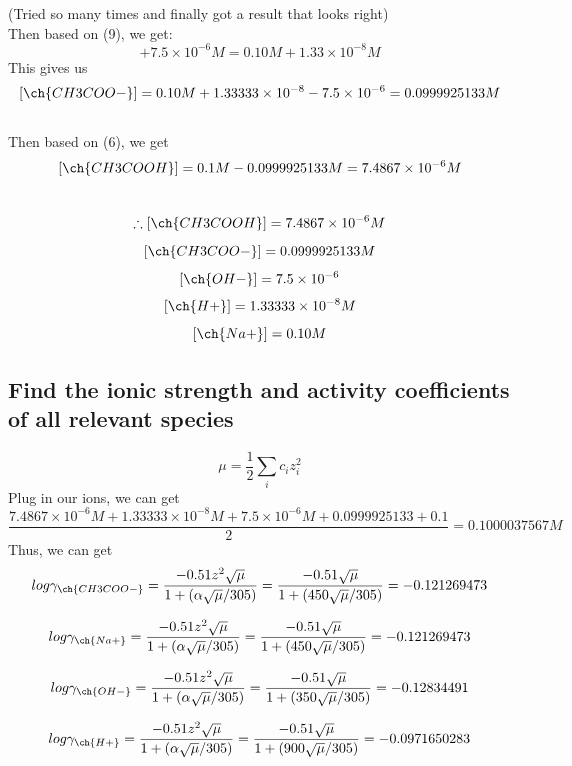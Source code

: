 \documentclass{article}
\begin{document}
\begin{large}
(Tried so many times and finally got a result that looks right)\\
Then based on (9), we get:
\begin{equation}
[\ch{CH3COO-}] + 7.5 \times 10^{-6}M = 0.10 M + 1.33 \times 10^{-8}M
\end{equation}
This gives us $$[\ch{CH3COO-}] = 0.10 M + 1.33333 \times 10^{-8} - 7.5 \times 10^{-6} = 0.0999925133M$$\\
Then based on (6), we get $$[\ch{CH3COOH}] = 0.1M - 0.0999925133M = 7.4867\times 10^{-6}M$$\\
$$\therefore [\ch{CH3COOH}]=7.4867\times 10^{-6}M$$
$$ [\ch{CH3COO-}]=0.0999925133M$$ $$[\ch{OH-}] = 7.5\times 10^{-6}$$
$$[\ch{H+}] = 1.33333 \times 10^{-8}M$$
$$[\ch{Na+}] = 0.10M$$

\subsection{Find the ionic strength and activity coefficients of all relevant species}
\begin{equation}
\mu = \frac{1}{2}\sum_i c_i z_i^2
\end{equation}
Plug in our ions, we can get
\begin{equation}
\frac{    7.4867\times 10^{-6}M + 1.33333 \times 10^{-8}M + 7.5\times 10^{-6}M + 0.0999925133 + 0.1}{2}  = 0.1000037567M
\end{equation}
Thus, we can get 
\begin{equation}
log \gamma_{\ch{CH3COO-}} = \frac{-0.51z^2\sqrt{\mu}}{1+(\alpha \sqrt{\mu}/305)} = 
\frac{-0.51\sqrt{\mu}}{1+(450\sqrt{\mu}/305)} = -0.121269473
\end{equation}

\begin{equation}
log \gamma_{\ch{Na+}} = \frac{-0.51z^2\sqrt{\mu}}{1+(\alpha \sqrt{\mu}/305)} = 
\frac{-0.51\sqrt{\mu}}{1+(450\sqrt{\mu}/305)} = -0.121269473
\end{equation}

\begin{equation}
log \gamma_{\ch{OH-}} = \frac{-0.51z^2\sqrt{\mu}}{1+(\alpha \sqrt{\mu}/305)} = 
\frac{-0.51\sqrt{\mu}}{1+(350\sqrt{\mu}/305)} = -0.12834491
\end{equation}

\begin{equation}
log \gamma_{\ch{H+}} = \frac{-0.51z^2\sqrt{\mu}}{1+(\alpha \sqrt{\mu}/305)} = 
\frac{-0.51\sqrt{\mu}}{1+(900\sqrt{\mu}/305)} = -0.0971650283
\end{equation}


\end{large}
\end{document}

